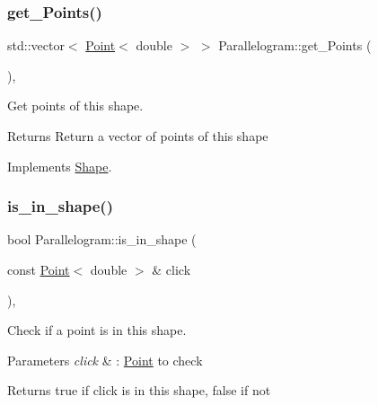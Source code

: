 \subsubsection{\texorpdfstring{get\+\_\+\+Points()}{get\_Points()}}
{\footnotesize\ttfamily std\+::vector$<$ \hyperlink{classPoint}{Point}$<$ double $>$ $>$ Parallelogram\+::get\+\_\+\+Points (\begin{DoxyParamCaption}{ }\end{DoxyParamCaption})\hspace{0.3cm}{\ttfamily [override]}, {\ttfamily [virtual]}}



Get points of this shape. 

\begin{DoxyReturn}{Returns}
Return a vector of points of this shape 
\end{DoxyReturn}


Implements \hyperlink{classShape_add74a5c682840fa4a519242b1ddbd0b5}{Shape}.

\mbox{\label{classParallelogram_a585b14ca0f65ed3a5007e8c1df3c6bc4}} 
\subsubsection{\texorpdfstring{is\+\_\+in\+\_\+shape()}{is\_in\_shape()}}
{\footnotesize\ttfamily bool Parallelogram\+::is\+\_\+in\+\_\+shape (\begin{DoxyParamCaption}\item[{const \hyperlink{classPoint}{Point}$<$ double $>$ \&}]{click }\end{DoxyParamCaption})\hspace{0.3cm}{\ttfamily [override]}, {\ttfamily [virtual]}}



Check if a point is in this shape. 


\begin{DoxyParams}{Parameters}
{\em click} & \+: \hyperlink{classPoint}{Point} to check \\
\hline
\end{DoxyParams}
\begin{DoxyReturn}{Returns}
true if click is in this shape, false if not 
\end{DoxyReturn}


